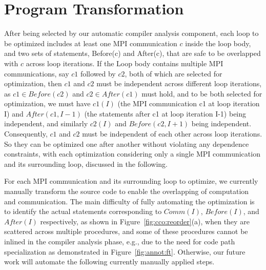 \section{Program Transformation}
\label{sec-opt}

After being selected by our automatic compiler analysis component, each loop 
to be optimized includes at least one MPI communication $c$ inside the loop body, and two sets of statements, 
Before(c) and After(c), that are safe to be overlapped with $c$ across loop iterations. If the Loop body contains 
multiple MPI communications, say $c1$ followed by $c2$, both of which are selected for optimization, then $c1$ and $c2$
must be independent across different loop iterations, as $c1 \in Before(c2)$ and $c2 \in After(c1)$ must hold, and to be
both selected  for optimization, we must have $c1(I)$ (the MPI communication c1 at loop iteration I) and $After(c1,I-1)$ (the statements after c1 at loop iteration I-1) being independent, and  similarly $c2(I)$ and $Before(c2,I+1)$  being independent. 
Consequently, $c1$ and $c2$ must be independent of each other across loop iterations. 
So they can be optimized one after another without violating any dependence constraints, with 
each optimization considering only a single MPI communication and its surrounding loop, discussed in the following.

For each MPI communication and its surrounding loop to optimize, we currently manually
transform the source code to enable the overlapping of
computation and communication. The main difficulty of fully automating the optimization is to identify the 
actual statements corresponding to $Comm(I)$, $Before(I)$, and $After(I)$ respectively, as shown in Figure~\ref{fig:cco:reorder}(a),
when they are scattered across multiple procedures,  and some of these procedures cannot be inlined in the compiler analysis phase, e.g., due to 
the need for code path specialization as demonstrated in Figure~\ref{fig:annot:ft}. 
Otherwise, our future work will automate the following currently manually applied steps. 


